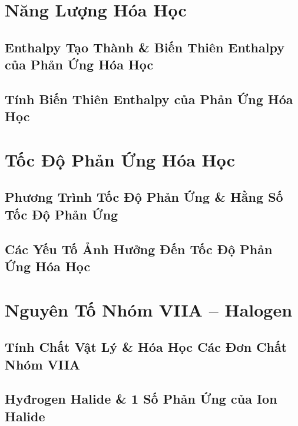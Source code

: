 \documentclass[oneside]{book}
\numberwithin{equation}{section}
\begin{document}

\chapter{Năng Lượng Hóa Học}

\section{Enthalpy Tạo Thành \& Biến Thiên Enthalpy của Phản Ứng Hóa Học}


\section{Tính Biến Thiên Enthalpy của Phản Ứng Hóa Học}


\chapter{Tốc Độ Phản Ứng Hóa Học}

\section{Phương Trình Tốc Độ Phản Ứng \& Hằng Số Tốc Độ Phản Ứng}


\section{Các Yếu Tố Ảnh Hưởng Đến Tốc Độ Phản Ứng Hóa Học}


\chapter{Nguyên Tố Nhóm VIIA -- Halogen}

\section{Tính Chất Vật Lý \& Hóa Học Các Đơn Chất Nhóm VIIA}


\section{Hyđrogen Halide \& 1 Số Phản Ứng của Ion Halide} 


\printbibliography[heading=bibintoc]
	
\end{document}
